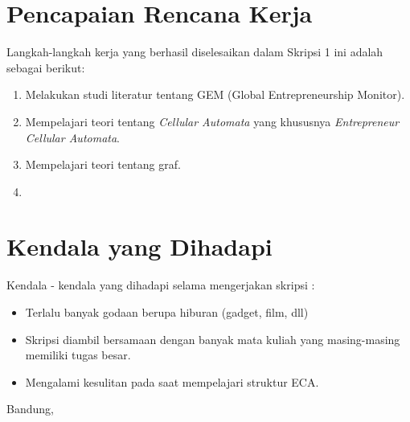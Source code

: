 \documentclass[a4paper,twoside]{article}
\begin{document}
\section{Pencapaian Rencana Kerja}
Langkah-langkah kerja yang berhasil diselesaikan dalam Skripsi 1 ini adalah sebagai berikut:
\begin{enumerate}
\item Melakukan studi literatur tentang GEM (Global Entrepreneurship Monitor).
\item Mempelajari teori tentang \textit{Cellular Automata} yang khususnya \textit{Entrepreneur Cellular Automata}.
\item Mempelajari teori tentang graf.
\item
\end{enumerate}



\section{Kendala yang Dihadapi}
Kendala - kendala yang dihadapi selama mengerjakan skripsi :
\begin{itemize}
	\item Terlalu banyak godaan berupa hiburan (gadget, film, dll)
	\item Skripsi diambil bersamaan dengan banyak mata kuliah yang masing-masing memiliki tugas besar.
	\item Mengalami kesulitan pada saat mempelajari struktur ECA.
\end{itemize}

\vspace{1cm}
\centering Bandung, \tanggal\\
\vspace{2cm} \nama \\ 
\vspace{1cm}
\end{document}
